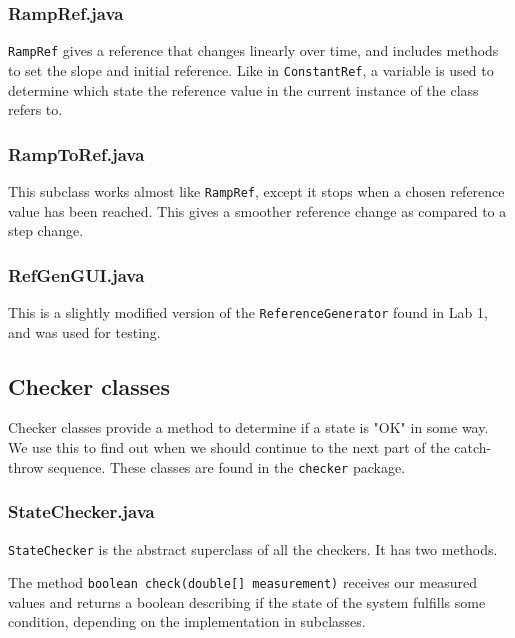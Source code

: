 \subsubsection{RampRef.java}
\texttt{RampRef} gives a reference that changes linearly over time, and includes methods to set the slope and initial reference. 
Like in \texttt{ConstantRef}, a variable is used to determine which state the reference value in the current instance of the class refers to.

\subsubsection{RampToRef.java}
This subclass works almost like \texttt{RampRef}, except it stops when a chosen reference value has been reached. 
This gives a smoother reference change as compared to a step change.

\subsubsection{RefGenGUI.java}
This is a slightly modified version of the \texttt{ReferenceGenerator} found in Lab 1, and was used for testing.








\subsection{Checker classes}\label{Checkers}
Checker classes provide a method to determine if a state is "OK" in some way. 
We use this to find out when we should continue to the next part of the catch-throw sequence. 
These classes are found in the \texttt{checker} package.
\subsubsection{StateChecker.java}
\texttt{StateChecker} is the abstract superclass of all the checkers. It has two methods.

The method \texttt{boolean check(double[] measurement)} receives our measured values and returns a boolean describing if the state of the system fulfills some condition, depending on the implementation in subclasses.

